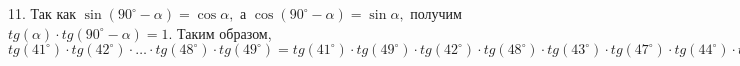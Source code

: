 11. Так как $\sin (90^\circ-\alpha)=\cos \alpha,$ а $\cos (90^\circ-\alpha)=\sin \alpha,$ получим $tg(\alpha)\cdot tg(90^\circ-\alpha)=1.$ Таким образом,
$tg(41^\circ)\cdot tg(42^\circ)\cdot \ldots \cdot tg(48^\circ)\cdot tg(49^\circ)=tg(41^\circ)\cdot tg(49^\circ)\cdot
tg(42^\circ)\cdot tg(48^\circ)\cdot
tg(43^\circ)\cdot tg(47^\circ)\cdot
tg(44^\circ)\cdot tg(46^\circ)\cdot tg(45^\circ)=1.$\\
